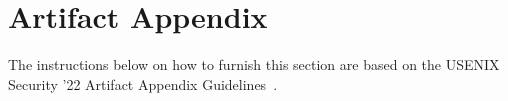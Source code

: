\section{Artifact Appendix}\label{s:appendix}

The instructions below on how to furnish this section are based on the USENIX
Security ’22 Artifact Appendix Guidelines~\cite{USENIX-WebArticle2022}.






